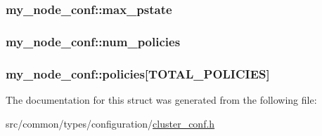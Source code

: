 \subsubsection[{\texorpdfstring{max\+\_\+pstate}{max_pstate}}]{ my\+\_\+node\+\_\+conf\+::max\+\_\+pstate}\hypertarget{structmy__node__conf_ab36cefab5685c5d456e2f3114bf818b5}{}\label{structmy__node__conf_ab36cefab5685c5d456e2f3114bf818b5}
\subsubsection[{\texorpdfstring{num\+\_\+policies}{num_policies}}]{ my\+\_\+node\+\_\+conf\+::num\+\_\+policies}\hypertarget{structmy__node__conf_a99054b26597f5d44b6b6e47364255707}{}\label{structmy__node__conf_a99054b26597f5d44b6b6e47364255707}
\subsubsection[{\texorpdfstring{policies}{policies}}]{ my\+\_\+node\+\_\+conf\+::policies\mbox{[}{\bf T\+O\+T\+A\+L\+\_\+\+P\+O\+L\+I\+C\+I\+ES}\mbox{]}}\hypertarget{structmy__node__conf_aa15014f1185e467cbf1f759c63d14e26}{}\label{structmy__node__conf_aa15014f1185e467cbf1f759c63d14e26}


The documentation for this struct was generated from the following file\+:\begin{DoxyCompactItemize}
\item 
src/common/types/configuration/\hyperlink{cluster__conf_8h}{cluster\+\_\+conf.\+h}\end{DoxyCompactItemize}
